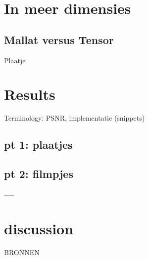 \documentclass[11pt]{amsart}
\begin{document}
\section{In meer dimensies}

\subsection{Mallat versus Tensor}
Plaatje

\section{Results}
Terminology: PSNR, implementatie (snippets)

\subsection{pt 1: plaatjes}
\subsection{pt 2: filmpjes}

-----

\section{discussion}

BRONNEN
\fi
\end{document}
